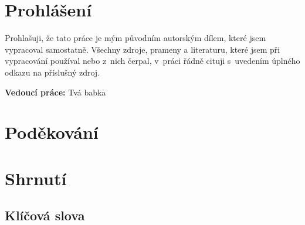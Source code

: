 \section*{Prohlášení} Prohlašuji, že tato práce je mým původním autorským dílem,
které jsem vypracoval samostatně. Všechny zdroje, prameny a literaturu, které
jsem při vypracování používal nebo z~nich čerpal, v~práci řádně cituji
s~uvedením úplného odkazu na příslušný zdroj.

\vfill\noindent
\textbf{Vedoucí práce:} Tvá babka   %
\cleardoublepage

\section*{Poděkování} %
\cleardoublepage

\section*{Shrnutí} %

\subsection*{Klíčová slova} %

